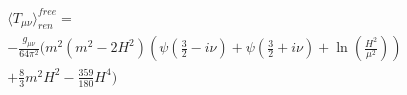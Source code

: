 \begin{equation}
\label{eq:set2} 
\begin{array}{l}
\langle T_{\mu\nu} \rangle_{ren}^{free} = \\
  - \frac{ g_{\mu\nu}}{64\pi^2}
   \Big( m^2(m^2-2 H^2)
    \left(\psi\left(\tfrac{3}{2}-i\nu\right)+\psi\left(\tfrac{3}{2}+i\nu\right)
    +\ln\left(\frac{H^2}{\mu^2}\right)
     \right)   \\ 
   + \tfrac{8}{3}m^2 H^2-\tfrac{359}{180}H^4 \Big)  
\end{array}
\end{equation}

